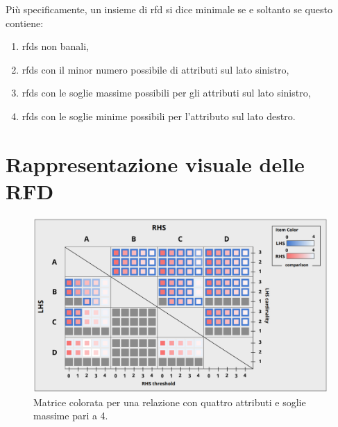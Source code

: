 Pi\`{u} specificamente, un insieme di \acrshort{rfd} si dice minimale se e soltanto se questo contiene:
\begin{enumerate}
    \item \acrshort{rfds} non banali,
    \item \acrshort{rfds} con il minor numero possibile di attributi sul lato sinistro,
    \item \acrshort{rfds} con le soglie massime possibili per gli attributi sul lato sinistro,
    \item \acrshort{rfds} con le soglie minime possibili per l'attributo sul lato destro.
\end{enumerate}

\section{Rappresentazione visuale delle RFD}
\label{section:visual_rep_metaphore}
\begin{figure}[ht]
    \centering
    \includegraphics[width=\linewidth]{capitoli/figure/matrix_metaphore}
    \caption{Matrice colorata per una relazione con quattro attributi e soglie massime pari a 4.}
    \label{fig:colored_matrix}
\end{figure}
